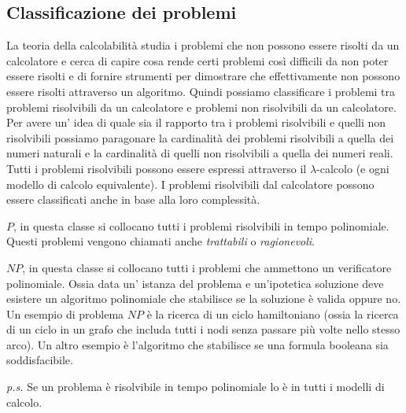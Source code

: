 \subsection{Classificazione dei problemi}
La teoria della calcolabilit\`a studia i problemi che non possono essere risolti da un calcolatore e cerca di capire cosa rende certi problemi cos\`i difficili da non poter essere risolti e di fornire strumenti per dimostrare che effettivamente non possono essere risolti attraverso un algoritmo.\newline
Quindi possiamo classificare i problemi tra problemi risolvibili da un calcolatore e problemi non risolvibili da un calcolatore.\newline
Per avere un' idea di quale sia il rapporto tra i problemi risolvibili e quelli non risolvibili possiamo paragonare la cardinalit\`a dei problemi risolvibili a quella dei numeri naturali e la cardinalit\`a di quelli non risolvibili a quella dei numeri reali.\newline
Tutti i problemi risolvibili possono essere espressi attraverso il $\lambda$-calcolo (e ogni modello di calcolo equivalente).\newline
I problemi risolvibili dal calcolatore possono essere classificati anche in base alla loro complessit\`a.
\begin{description}
	\item $P$, in questa classe si collocano tutti i problemi risolvibili in tempo polinomiale. Questi problemi vengono chiamati anche \emph{trattabili} o \emph{ragionevoli}.
	\item $NP$, in questa classe si collocano tutti i problemi che ammettono un verificatore polinomiale. Ossia data un' istanza del problema e un'ipotetica soluzione deve esistere un algoritmo polinomiale che stabilisce se la soluzione \`e valida oppure no. Un esempio di problema $NP$ \`e la ricerca di un ciclo hamiltoniano (ossia la ricerca di un ciclo in un grafo che includa tutti i nodi senza passare pi\`u volte nello stesso arco). Un altro esempio \`e l'algoritmo che stabilisce se una formula booleana sia soddisfacibile.
\end{description}

\emph{p.s.} Se un problema \`e risolvibile in tempo polinomiale lo \`e in tutti i modelli di calcolo.


